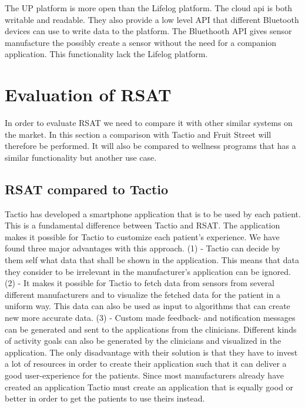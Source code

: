 \documentclass{cslthse-msc}
\begin{document}
The UP platform is more open than the Lifelog platform. The cloud api is both writable and readable. They also provide a low level API that different Bluetooth devices can use to write data to the platform. The Bluethooth API gives sensor manufacture the possibly create a sensor without the need for a companion application. This functionality lack the Lifelog platform.   



\section{Evaluation of RSAT}

In order to evaluate RSAT we need to compare it with other similar systems on the market. In this section a comparison with Tactio and Fruit Street will therefore be performed. It will also be compared to wellness programs that has a similar functionality but another use case. 

\subsection{RSAT compared to Tactio}

Tactio has developed a smartphone application that is to be used by each patient. This is a fundamental difference between Tactio and RSAT. The application makes it possible for Tactio to customize each patient’s experience. We have found three major advantages with this approach. (1) - Tactio can decide by them self what data that shall be shown in the application. This means that data they consider to be irrelevant in the manufacturer’s application can be ignored. (2) - It makes it possible for Tactio to fetch data from sensors from several different manufacturers and to visualize the fetched data for the patient in a uniform way. This data can also be used as input to algorithms that can create new more accurate data. (3) - Custom made feedback- and notification messages can be generated and sent to the applications from the clinicians. Different kinds of activity goals can also be generated by the clinicians and visualized in the application. The only disadvantage with their solution is that they have to invest a lot of resources in order to create their application such that it can deliver a good user-experience for the patients. Since most manufacturers already have created an application Tactio must create an application that is equally good or better in order to get the patients to use theirs instead. 
\end{document}
